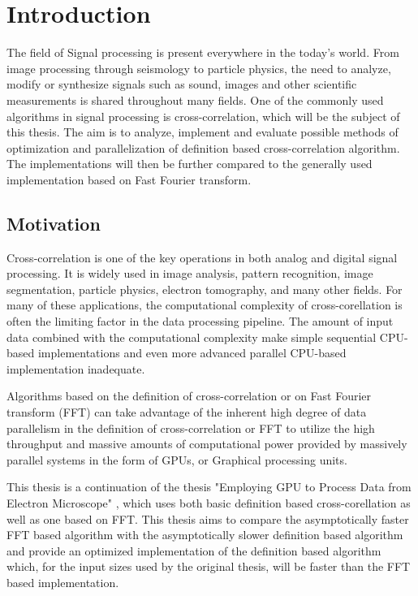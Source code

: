 \chapter*{Introduction}

The field of Signal processing is present everywhere in the today's world. From image processing through seismology to particle physics, the need to analyze, modify or synthesize signals such as sound, images and other scientific measurements is shared throughout many fields. One of the commonly used algorithms in signal processing is cross-correlation, which will be the subject of this thesis. The aim is to analyze, implement and evaluate possible methods of optimization and parallelization of definition based cross-correlation algorithm. The implementations will then be further compared to the generally used implementation based on Fast Fourier transform.

\section*{Motivation}

Cross-correlation is one of the key operations in both analog and digital signal processing. %
It is widely used in image analysis, pattern recognition, image segmentation, particle physics, electron tomography, and many other fields. For many of these applications, the computational complexity of cross-corellation is often the limiting factor in the data processing pipeline. The amount of input data combined with the computational complexity make simple sequential CPU-based implementations and even more advanced parallel CPU-based implementation inadequate.

Algorithms based on the definition of cross-correlation or on Fast Fourier transform (FFT) can take advantage of the inherent high degree of data parallelism in the definition of cross-correlation or FFT to utilize the high throughput and massive amounts of computational power provided by massively parallel systems in the form of GPUs, or Graphical processing units. 

This thesis is a continuation of the thesis "Employing GPU to Process Data from Electron Microscope" \citep{misko}, which uses both basic definition based cross-corellation as well as one based on FFT. This thesis aims to compare the asymptotically faster FFT based algorithm with the asymptotically slower definition based algorithm and provide an optimized implementation of the definition based algorithm which, for the input sizes used by the original thesis, will be faster than the FFT based implementation.

